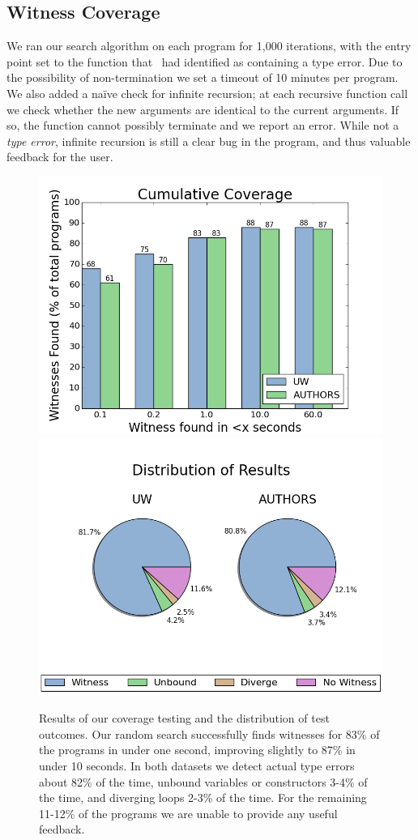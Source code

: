 \subsection{Witness Coverage}
\label{sec:eval:witness-coverage}
%
We ran our search algorithm on each program for 1,000 iterations, with
the entry point set to the function that \ocaml\ had identified as
containing a type error.
%
Due to the possibility of non-termination we set a timeout of 10 minutes
per program.
%
%
We also added a na\"ive check for infinite recursion; at each recursive
function call we check whether the new arguments are identical to the
current arguments.
%
If so, the function cannot possibly terminate and we report an error.
%
While not a \emph{type error}, infinite recursion is still a clear bug
in the program, and thus valuable feedback for the user.

\begin{figure}[t]
\centering
\begin{minipage}{\linewidth}
\centering
\includegraphics[width=0.49\linewidth]{coverage.png}
\includegraphics[width=0.49\linewidth]{distrib.png}
\end{minipage}
\caption{Results of our coverage testing and the distribution of test
  outcomes. Our random search successfully finds witnesses for 83\% of
  the programs in under one second, improving slightly to 87\% in under
  10 seconds. In both datasets we detect actual type errors about 82\%
  of the time, unbound variables or constructors 3-4\% of the time, and
  diverging loops 2-3\% of the time. For the remaining 11-12\% of the
  programs we are unable to provide any useful feedback.  }
\label{fig:results-witness}
\end{figure}

